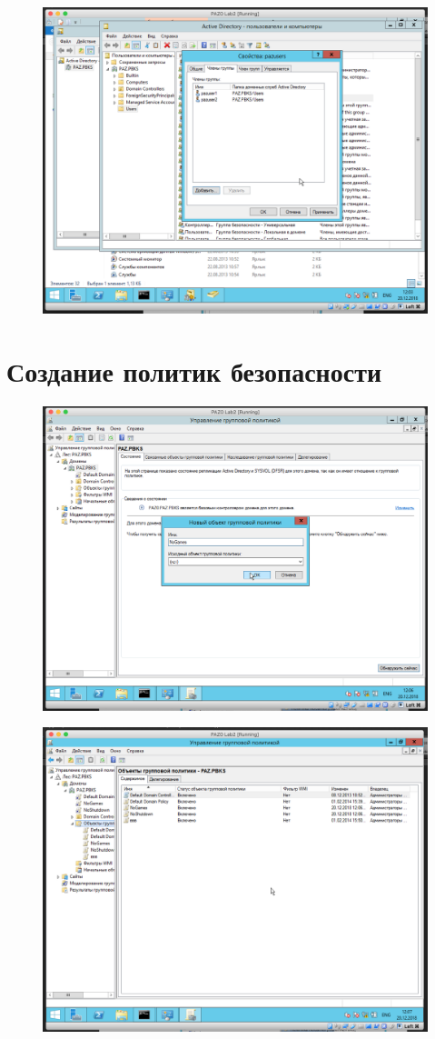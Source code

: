 \begin{figure}[H]
	\centering
	\includegraphics[width=.8\textwidth]{images/6.png}
\end{figure}

\section{Создание политик безопасности}

\begin{figure}[H]
	\centering
	\includegraphics[width=.8\textwidth]{images/7.png}
\end{figure}

\begin{figure}[H]
	\centering
	\includegraphics[width=.8\textwidth]{images/8.png}
\end{figure}

